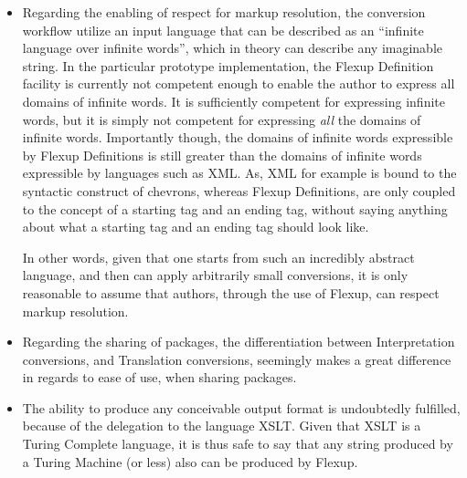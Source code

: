 \documentclass{scrreprt}
\begin{document}
\begin{itemize}
\item Regarding the enabling of respect for markup resolution, the conversion workflow utilize an input language that can be described as an ``infinite language over infinite words'', which in theory can describe any imaginable string. In the particular prototype implementation, the Flexup Definition facility is currently not competent enough to enable the author to express all domains of infinite words. It is sufficiently competent for expressing infinite words, but it is simply not competent for expressing \emph{all} the domains of infinite words. Importantly though, the domains of infinite words expressible by Flexup Definitions is still greater than the domains of infinite words expressible by languages such as XML. As, XML for example is bound to the syntactic construct of chevrons, whereas Flexup Definitions, are only coupled to the concept of a starting tag and an ending tag, without saying anything about what a starting tag and an ending tag should look like.

In other words, given that one starts from such an incredibly abstract language, and then can apply arbitrarily small conversions, it is only reasonable to assume that authors, through the use of Flexup, can respect markup resolution.

\item Regarding the sharing of packages, the differentiation between Interpretation conversions, and Translation conversions, seemingly makes a great difference in regards to ease of use, when sharing packages.

\item The ability to produce any conceivable output format is undoubtedly fulfilled, because of the delegation to the language XSLT. Given that XSLT is a Turing Complete language, it is thus safe to say that any string produced by a Turing Machine (or less) also can be produced by Flexup.
\end{itemize}
\end{document}

